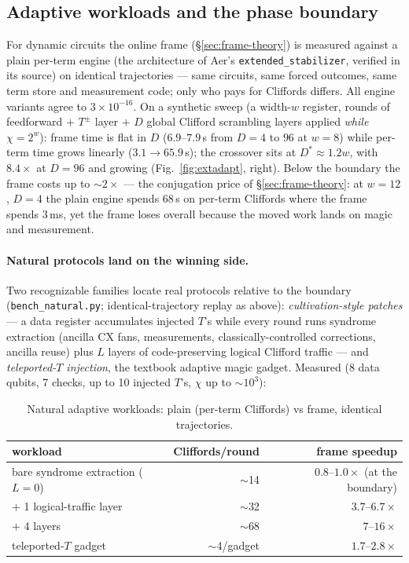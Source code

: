 \documentclass[11pt]{article}
\begin{document}
\subsection{Adaptive workloads and the phase boundary}\label{sec:adaptive}
For dynamic circuits the online frame (\S\ref{sec:frame-theory}) is measured
against a plain per-term engine (the architecture of Aer's
\texttt{extended\_stabilizer}, verified in its source) on identical
trajectories --- same circuits, same forced outcomes, same term store and
measurement code; only who pays for Cliffords differs. All engine variants
agree to $3\times10^{-16}$. On a synthetic sweep (a width-$w$ register,
rounds of feedforward $+$ $T^\pm$ layer $+$ $D$ global Clifford scrambling
layers applied \emph{while} $\chi=2^w$): frame time is flat in $D$
($6.9$--$7.9$\,s from $D{=}4$ to $96$ at $w{=}8$) while per-term time grows
linearly ($3.1\to65.9$\,s); the crossover sits at $D^*\!\approx\!1.2w$, with
$8.4\times$ at $D{=}96$ and growing (Fig.~\ref{fig:extadapt}, right). Below
the boundary the frame costs up to $\sim\!2\times$ --- the conjugation price
of \S\ref{sec:frame-theory}: at $w{=}12$, $D{=}4$ the plain engine spends
$68$\,s on per-term Cliffords where the frame spends $3$\,ms, yet the frame
loses overall because the moved work lands on magic and measurement.

\paragraph{Natural protocols land on the winning side.} Two recognizable
families locate real protocols relative to the boundary
(\texttt{bench\_natural.py}; identical-trajectory replay as above):
\emph{cultivation-style patches} --- a data register accumulates injected
$T$'s while every round runs syndrome extraction (ancilla CX fans,
measurements, classically-controlled corrections, ancilla reuse) plus $L$
layers of code-preserving logical Clifford traffic --- and
\emph{teleported-$T$ injection}, the textbook adaptive magic gadget.
Measured (8 data qubits, 7 checks, up to 10 injected $T$'s, $\chi$ up to
$\sim\!10^3$):

\begin{table}[h]\centering
\caption{Natural adaptive workloads: plain (per-term Cliffords) vs frame,
identical trajectories.}\label{tab:natural}
\begin{tabular}{lrr}
\toprule
workload & Cliffords/round & frame speedup \\
\midrule
bare syndrome extraction ($L{=}0$) & $\sim$14 & $0.8$--$1.0\times$ (at the boundary) \\
$+$ 1 logical-traffic layer & $\sim$32 & $3.7$--$6.7\times$ \\
$+$ 4 layers & $\sim$68 & $7$--$16\times$ \\
teleported-$T$ gadget & $\sim$4/gadget & $1.7$--$2.8\times$ \\
\bottomrule
\end{tabular}
\end{table}
\end{document}
